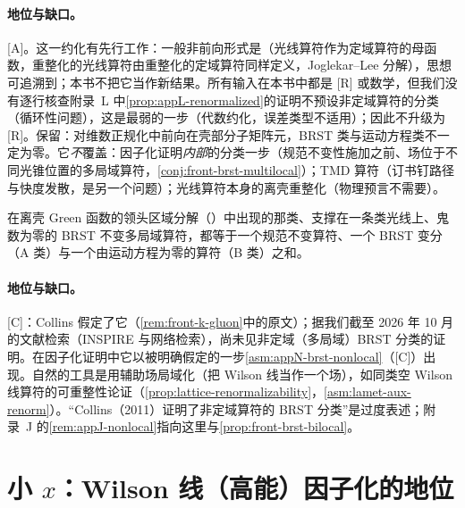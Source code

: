 \paragraph{地位与缺口。}[A]。这一约化有先行工作：一般非前向形式是\cite[式~(2.4)、(2.6)、(3.1)、(3.2)]{Braun:2019qtp}（光线算符作为定域算符的母函数，重整化的光线算符由重整化的定域算符同样定义，Joglekar--Lee 分解），思想可追溯到\cite{Balitsky:1987bk}；本书不把它当作新结果。所有输入在本书中都是 [R] 或数学，但我们没有逐行核查附录~L 中\cref{prop:appL-renormalized}的证明不预设非定域算符的分类（循环性问题），这是最弱的一步（代数约化，误差类型不适用）；因此不升级为 [R]。保留：对维数正规化中前向在壳部分子矩阵元，BRST 类与运动方程类不一定为零。它\emph{不}覆盖：因子化证明\emph{内部}的分类一步（规范不变性施加之前、场位于不同光锥位置的多局域算符，\cref{conj:front-brst-multilocal}）；TMD 算符（订书钉路径与快度发散，是另一个问题）；光线算符本身的离壳重整化（物理预言不需要）。

\begin{conjecture}\label{conj:front-brst-multilocal}
在离壳 Green 函数的领头区域分解（\cite[式~(11.12)]{Collins2011}）中出现的那类、支撑在一条类光线上、鬼数为零的 BRST 不变多局域算符，都等于一个规范不变算符、一个 BRST 变分（A 类）与一个由运动方程为零的算符（B 类）之和。
\end{conjecture}

\paragraph{地位与缺口。}[C]：Collins 假定了它（\cref{rem:front-k-gluon}中的原文）；据我们截至 2026 年 10 月的文献检索（INSPIRE 与网络检索），尚未见非定域（多局域）BRST 分类的证明。在因子化证明中它以被明确假定的一步\cref{asm:appN-brst-nonlocal}（[C]）出现。自然的工具是用辅助场局域化（把 Wilson 线当作一个场），如同类空 Wilson 线算符的可重整性论证\cite{Ji:2017oey,Ishikawa:2017faj,Green:2017xeu}（\cref{prop:lattice-renormalizability}，\cref{asm:lamet-aux-renorm}）。“Collins（2011）证明了非定域算符的 BRST 分类”是过度表述；附录~J 的\cref{rem:appJ-nonlocal}指向这里与\cref{prop:front-brst-bilocal}。

\section{小 $x$：Wilson 线（高能）因子化的地位}\label{sec:front-smallx}

